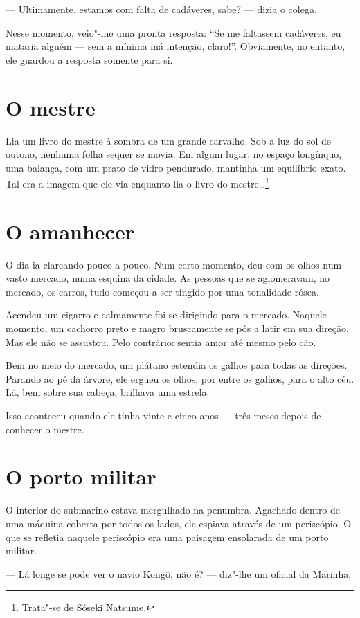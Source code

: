--- Ultimamente, estamos com falta de cadáveres, sabe? --- dizia o colega.

Nesse momento, veio"-lhe uma pronta resposta: ``Se me faltassem cadáveres,
eu mataria alguém --- sem a mínima má intenção, claro!''. Obviamente, no
entanto, ele guardou a resposta somente para si.

\section{O mestre}

Lia um livro do mestre à sombra de um grande carvalho. Sob a luz do sol 
de outono, nenhuma folha sequer se movia. Em algum lugar, no espaço
longínquo, uma balança, com um prato de vidro pendurado, mantinha um
equilíbrio exato. Tal era a imagem que ele via enquanto lia o livro do
mestre\ldots{}\footnote{ Trata"-se de Sôseki Natsume.}

\section{O amanhecer}

O dia ia clareando pouco a pouco. Num certo momento, deu com os olhos
num vasto mercado, numa esquina da cidade. As pessoas que se
aglomeravam, no mercado, os carros, tudo começou a ser tingido por uma
tonalidade rósea.

Acendeu um cigarro e calmamente foi se dirigindo para o mercado. Naquele
momento, um cachorro preto e magro bruscamente se pôs a latir em sua
direção. Mas ele não se assustou. Pelo contrário: sentia amor até mesmo
pelo cão.

Bem no meio do mercado, um plátano estendia os galhos para todas as
direções. Parando ao pé da árvore, ele ergueu os olhos, por entre os
galhos, para o alto céu. Lá, bem sobre sua cabeça, brilhava uma
estrela.

Isso aconteceu quando ele tinha vinte e cinco anos --- três meses depois
de conhecer o mestre.

\section{O porto militar}

O interior do submarino estava mergulhado na penumbra. Agachado dentro
de uma máquina coberta por todos os lados, ele espiava através de um
periscópio. O que se refletia naquele periscópio era uma paisagem
ensolarada de um porto militar.

--- Lá longe se pode ver o navio Kongô, não é? --- diz"-lhe um oficial da
Marinha.

